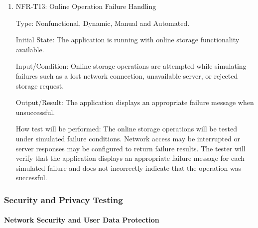 \documentclass[12pt, titlepage]{article}
\begin{document}
\begin{enumerate}
\item{NFR-T13: Online Operation Failure Handling\\}

Type: Nonfunctional, Dynamic, Manual and Automated.

Initial State: The application is running with online storage
functionality available.

Input/Condition: Online storage operations are attempted while
simulating failures such as a lost network connection, unavailable
server, or rejected storage request.

Output/Result: The application displays an appropriate failure
message when unsuccessful.

How test will be performed: The online storage operations will
be tested under simulated failure conditions. Network access may
be interrupted or server responses may be configured to return
failure results. The tester will verify that the application
displays an appropriate failure message for each simulated
failure and does not incorrectly indicate that the operation
was successful.

\end{enumerate}


\subsubsection{Security and Privacy Testing}

\paragraph{Network Security and User Data Protection}
\end{document}

